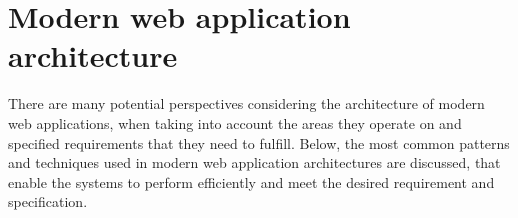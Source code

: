 



\section{Modern web application architecture}

There are many potential perspectives considering the architecture of modern web applications, when taking into account the areas they operate on and specified requirements that they need to fulfill. Below, the most common patterns and techniques used in modern web application architectures are discussed, that enable the systems to perform efficiently and meet the desired requirement and specification. 

